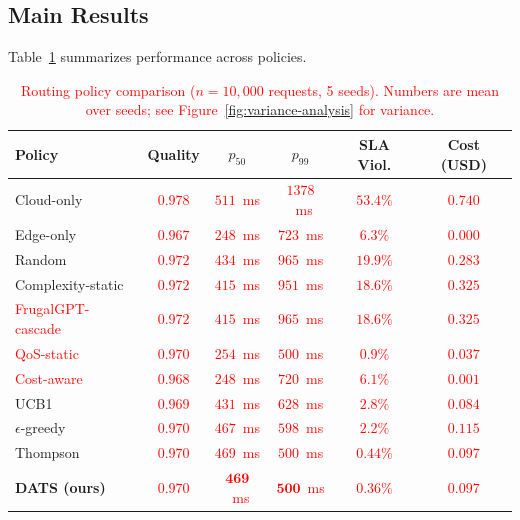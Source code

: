 \documentclass[final,3p,twocolumn,authoryear]{elsarticle}
\newcommand{\rev}[1]{\textcolor{red}{#1}}
\theoremstyle{plain}
\theoremstyle{definition}
\begin{document}
\subsection{Main Results}

Table~\ref{tab:main-results} summarizes performance across policies.

\begin{table}[t]
  \centering
  \caption{\rev{Routing policy comparison ($n{=}10{,}000$ requests, 5 seeds). Numbers are mean over seeds; see Figure~\ref{fig:variance-analysis} for variance.}}
  \label{tab:main-results}
  \small
  \begin{tabular}{lccccc}
    \toprule
    \textbf{Policy} & \textbf{Quality} & \textbf{$p_{50}$} & \textbf{$p_{99}$} & \textbf{SLA Viol.} & \textbf{Cost (USD)} \\
    \midrule
    Cloud-only                & \rev{$0.978$} & \rev{$511$~ms} & \rev{$1378$~ms} & \rev{$53.4\%$} & \rev{$0.740$} \\
    Edge-only                 & \rev{$0.967$} & \rev{$248$~ms} & \rev{$723$~ms}  & \rev{$6.3\%$}  & \rev{$0.000$} \\
    Random                    & \rev{$0.972$} & \rev{$434$~ms} & \rev{$965$~ms}  & \rev{$19.9\%$} & \rev{$0.283$} \\
    Complexity-static         & \rev{$0.972$} & \rev{$415$~ms} & \rev{$951$~ms}  & \rev{$18.6\%$} & \rev{$0.325$} \\
    \rev{FrugalGPT-cascade}   & \rev{$0.972$} & \rev{$415$~ms} & \rev{$965$~ms}  & \rev{$18.6\%$} & \rev{$0.325$} \\
    \rev{QoS-static}          & \rev{$0.970$} & \rev{$254$~ms} & \rev{$500$~ms}  & \rev{$0.9\%$}  & \rev{$0.037$} \\
    \rev{Cost-aware}          & \rev{$0.968$} & \rev{$248$~ms} & \rev{$720$~ms}  & \rev{$6.1\%$}  & \rev{$0.001$} \\
    UCB1                      & \rev{$0.969$} & \rev{$431$~ms} & \rev{$628$~ms}  & \rev{$2.8\%$}  & \rev{$0.084$} \\
    $\epsilon$-greedy         & \rev{$0.970$} & \rev{$467$~ms} & \rev{$598$~ms}  & \rev{$2.2\%$}  & \rev{$0.115$} \\
    Thompson                  & \rev{$0.970$} & \rev{$469$~ms} & \rev{$500$~ms}  & \rev{$0.44\%$} & \rev{$0.097$} \\
    \textbf{DATS (ours)}      & \rev{$\mathbf{0.970}$} & \rev{$\mathbf{469}$~ms} & \rev{$\mathbf{500}$~ms} & \rev{$\mathbf{0.36\%}$} & \rev{$\mathbf{0.097}$} \\
    \bottomrule
  \end{tabular}
\end{table}
\end{document}
